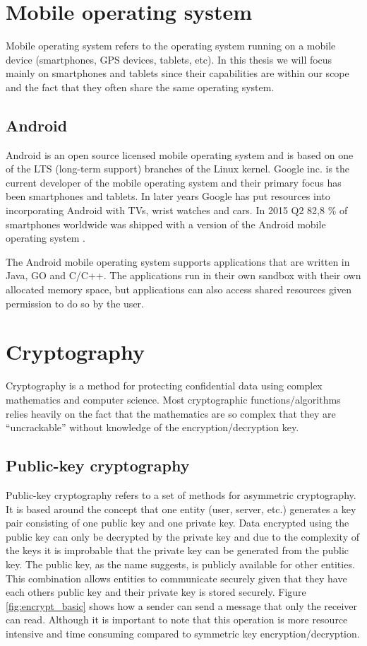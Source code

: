 \section{Mobile operating system}
Mobile operating system refers to the operating system running on a mobile device (smartphones, GPS devices, tablets, etc). In this thesis we will focus mainly on smartphones and tablets since their capabilities are within our scope and the fact that they often share the same operating system.

\subsection{Android}
Android is an open source licensed mobile operating system and is based on one of the LTS (long-term support) branches of the Linux kernel. Google inc. \cite{google} is the current developer of the mobile operating system and their primary focus has been smartphones and tablets. In later years Google has put resources into incorporating Android with TVs, wrist watches and cars. In 2015 Q2 82,8 \% of smartphones worldwide was shipped with a version of the Android mobile operating system \cite{androidMarketShare}.

The Android mobile operating system supports applications that are written in Java, GO and C/C++. The applications run in their own sandbox with their own allocated memory space, but applications can also access shared resources given permission to do so by the user.

\section{Cryptography}
Cryptography is a method for protecting confidential data using complex mathematics and computer science. Most cryptographic functions/algorithms relies heavily on the fact that the mathematics are so complex that they are ``uncrackable'' without knowledge of the encryption/decryption key.

\subsection{Public-key cryptography}
\label{sec:publicKeyCrypto}
Public-key cryptography refers to a set of methods for asymmetric cryptography. It is based around the concept that one entity (user, server, etc.) generates a key pair consisting of one public key and one private key. Data encrypted using the public key can only be decrypted by the private key and due to the complexity of the keys it is improbable that the private key can be generated from the public key. The public key, as the name suggests, is publicly available for other entities. This combination allows entities to communicate securely given that they have each others public key and their private key is stored securely. Figure \ref{fig:encrypt_basic} shows how a sender can send a message that only the receiver can read. Although it is important to note that this operation is more resource intensive and time consuming compared to symmetric key encryption/decryption.

